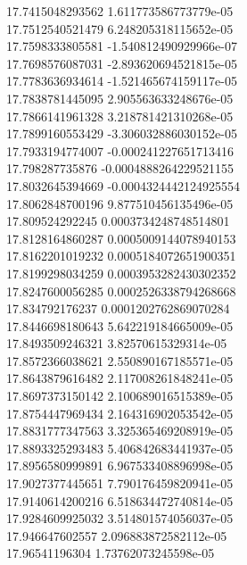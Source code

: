 {17.7415048293562 1.611773586773779e-05
 \\
17.7512540521479 6.248205318115652e-05
 \\
17.7598333805581 -1.540812490929966e-07
 \\
17.7698576087031 -2.893620694521815e-05
 \\
17.7783636934614 -1.521465674159117e-05
 \\
17.7838781445095 2.905563633248676e-05
 \\
17.7866141961328 3.218781421310268e-05
 \\
17.7899160553429 -3.306032886030152e-05
 \\
17.7933194774007 -0.000241227651713416
 \\
17.798287735876 -0.0004888264229521155
 \\
17.8032645394669 -0.0004324442124925554
 \\
17.8062848700196 9.877510456135496e-05
 \\
17.809524292245 0.0003734248748514801
 \\
17.8128164860287 0.0005009144078940153
 \\
17.8162201019232 0.0005184072651900351
 \\
17.8199298034259 0.0003953282430302352
 \\
17.8247600056285 0.0002526338794268668
 \\
17.834792176237 0.0001202762869070284
 \\
17.8446698180643 5.642219184665009e-05
 \\
17.8493509246321 3.82570615329314e-05
 \\
17.8572366038621 2.550890167185571e-05
 \\
17.8643879616482 2.117008261848241e-05
 \\
17.8697373150142 2.100689016515389e-05
 \\
17.8754447969434 2.164316902053542e-05
 \\
17.8831777347563 3.325365469208919e-05
 \\
17.8893325293483 5.406842683441937e-05
 \\
17.8956580999891 6.967533408896998e-05
 \\
17.9027377445651 7.790176459820941e-05
 \\
17.9140614200216 6.518634472740814e-05
 \\
17.9284609925032 3.514801574056037e-05
 \\
17.946647602557 2.096883872582112e-05
 \\
17.96541196304 1.73762073245598e-05
}
